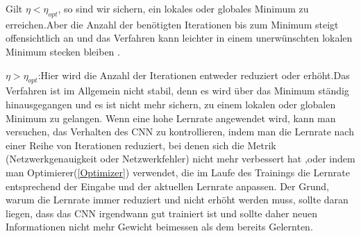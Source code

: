 \documentclass[12pt,a4paper]{scrartcl}
\numberwithin{equation}{section}
\begin{document}
Gilt {$ \eta < \eta_{opt} $}, so sind wir sichern, ein lokales oder globales Minimum zu erreichen.Aber die Anzahl der benötigten Iterationen bis zum Minimum steigt offensichtlich an und das Verfahren kann leichter in einem unerwünschten lokalen Minimum stecken bleiben .

{$ \eta > \eta_{opt} $}:Hier wird die Anzahl der Iterationen entweder reduziert oder erhöht.Das  Verfahren ist im Allgemein nicht stabil, denn es wird über das Minimum ständig hinausgegangen und es ist nicht mehr sichern, zu einem lokalen oder globalen Minimum zu gelangen.  Wenn eine hohe Lernrate angewendet wird, kann man versuchen, das Verhalten des \ac{CNN} zu kontrollieren, indem man die Lernrate nach einer Reihe von Iterationen reduziert, bei denen sich die Metrik (Netzwerkgenauigkeit oder Netzwerkfehler) nicht mehr verbessert hat ,oder indem man Optimierer(\ref{Optimizer}) verwendet, die im Laufe des Trainings die Lernrate entsprechend der Eingabe und der aktuellen Lernrate anpassen. Der Grund, warum die Lernrate immer reduziert und nicht erhöht werden muss, sollte daran liegen, dass das \ac{CNN} irgendwann gut trainiert ist und sollte daher neuen Informationen nicht mehr Gewicht  beimessen als dem bereits Gelernten.
\end{document}
